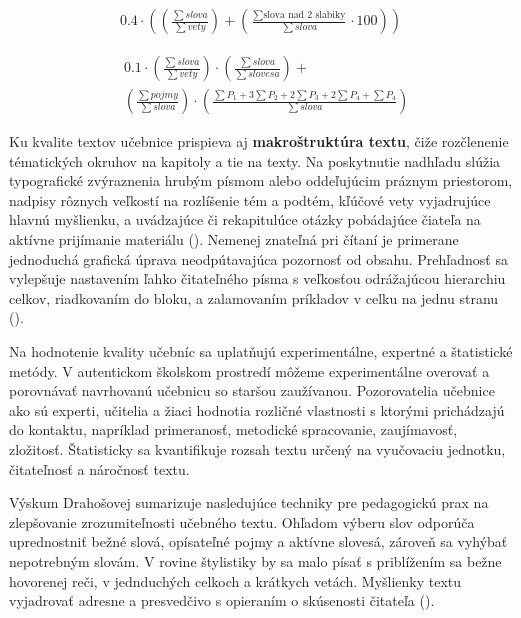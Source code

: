 \begin{ceqn}\begin{align}
0.4 \cdot \left(\left(\frac{\sum slova}{\sum vety}\right) + 
\left(\frac{\sum \text{slova nad 2 slabiky}}{\sum slova}\cdot 100\right)\right)
\label{equ:fog-index}
\end{align}\end{ceqn}

\begin{equation}\begin{split}
& 0.1 \cdot \left(\frac{\sum slova}{\sum vety}\right) \cdot  \left(\frac{\sum slova}{\sum slovesa}\right) + \\
& \left(\frac{\sum pojmy}{\sum slova}\right) \cdot \left(\frac{\sum P_1 + 3\sum P_2 + 2\sum P_3 + 2\sum P_4 + \sum P_4}{\sum slova}\right)
\label{equ:nestler-method}
\end{split}\end{equation}

Ku kvalite textov učebnice prispieva aj \textbf{makroštruktúra textu}, čiže rozčlenenie tématických okruhov na kapitoly a tie na texty. Na poskytnutie nadhľadu slúžia typografické zvýraznenia hrubým písmom alebo oddeľujúcim práznym priestorom, nadpisy rôznych veľkostí na rozlíšenie tém a podtém, kľúčové vety vyjadrujúce hlavnú myšlienku, a uvádzajúce či rekapitulúce otázky pobádajúce čiateľa na aktívne prijímanie materiálu (\cite{pavlovkin_ziak_1989}). Nemenej znateľná pri čítaní je primerane jednoduchá grafická úprava neodpútavajúca pozornosť od obsahu. Prehľadnosť sa vylepšuje nastavením ľahko čitateľného písma s veľkosťou odrážajúcou hierarchiu celkov, riadkovaním do bloku, a zalamovaním príkladov v celku na jednu stranu (\cite{mlady_tvorba_1988}).

Na hodnotenie kvality učebníc sa uplatňujú experimentálne, expertné a štatistické metódy. V autentickom školskom prostredí môžeme experimentálne overovať a porovnávať navrhovanú učebnicu so staršou zaužívanou. Pozorovatelia učebnice ako sú experti, učitelia a žiaci hodnotia rozličné vlastnosti s ktorými prichádzajú do kontaktu, napríklad primeranosť, metodické spracovanie, zaujímavosť, zložitosť. Štatisticky sa kvantifikuje rozsah textu určený na vyučovaciu jednotku, čitateľnosť a náročnosť textu.

Výskum Drahošovej sumarizuje nasledujúce techniky pre pedagogickú prax na zlepšovanie zrozumiteľnosti učebného textu. Ohľadom výberu slov odporúča uprednostniť bežné slová, opísateľné pojmy a aktívne slovesá, zároveň sa vyhýbať nepotrebným slovám. V rovine štylistiky by sa malo písať s priblížením sa bežne hovorenej reči, v jednduchých celkoch a krátkych vetách. Myšlienky textu vyjadrovať adresne a presvedčivo s opieraním o skúsenosti čitateľa (\cite{drahosova_hodnotenie_2014}).

